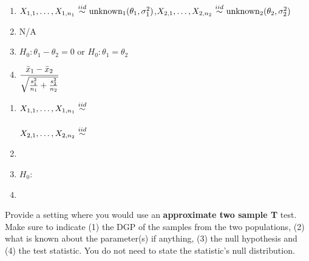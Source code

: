 \documentclass[12pt]{article}
\begin{document}
\begin{enumerate}[(a)]
{{\begin{enumerate}[(1)]
    \item $X_{1,1}, \ldots, X_{1,n_1} \iid \text{unknown}_1(\theta_1,\sigsq_1)$,\quad $X_{2,1}, \ldots, X_{2,n_2} \iid \text{unknown}_2(\theta_2,\sigsq_2)$
    \item N/A
    \item $H_0: \theta_1 - \theta_2 = 0$ or $H_0: \theta_1 = \theta_2$
    \item $\displaystyle\frac{\xbar_1 - \xbar_2}{\sqrt{\frac{s^2_1}{n_1} + \frac{s^2_2}{n_2}}}$
\end{enumerate}
}}{
\begin{enumerate}[(1)]
    \item $X_{1,1}, \ldots, X_{1,n_1} \iid$\\ ~\\
    $X_{2,1}, \ldots, X_{2,n_2} \iid$ \\
    \item ~\\
    \item $H_0$:\\
    \item ~
\end{enumerate}
}


 Provide a setting where you would use an \textbf{approximate two sample T} test. Make sure to indicate (1) the DGP of the samples from the two populations, (2) what is known about the parameter(s) if anything, (3) the null hypothesis and (4) the test statistic. You do not need to state the statistic's null distribution.

\iftoggle{solutions}{\inred{
\begin{enumerate}[(1)]
    \item $X_{1,1}, \ldots, X_{1,n_1} \iid \normnot{\theta_1}{\sigsq_1}$,\quad $X_{2,1}, \ldots, X_{2,n_2} \iid \normnot{\theta_2}{\sigsq_2}$
    \item nothing is known
    \item $H_0: \theta_1 - \theta_2 = 0$ or $H_0: \theta_1 = \theta_2$
    \item $\displaystyle\frac{\xbar_1 - \xbar_2}{\sqrt{\frac{s^2_1}{n_1} + \frac{s^2_2}{n_2}}}$
\end{enumerate}
Note: this is the case where the test statistic is drawn from the Fisher-Behrens distribution which can be approximated by the Welch-Satterthwaite T distribution.
}}{
\begin{enumerate}[(1)]
    \item $X_{1,1}, \ldots, X_{1,n_1} \iid$\\ ~\\
    $X_{2,1}, \ldots, X_{2,n_2} \iid$ \\
    \item ~\\
    \item $H_0$:\\
    \item ~\spc{2}
\end{enumerate}
}\pagebreak



\end{enumerate}
\end{document}

